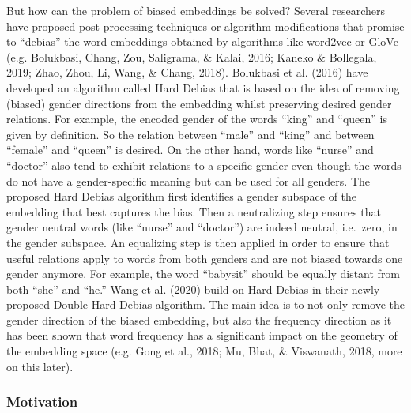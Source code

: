 \documentclass[
  english,
  man,floatsintext]{apa6}
\begin{document}
But how can the problem of biased embeddings be solved? Several researchers have proposed post-processing techniques or algorithm modifications that promise to ``debias'' the word embeddings obtained by algorithms like word2vec or GloVe (e.g. Bolukbasi, Chang, Zou, Saligrama, \& Kalai, 2016; Kaneko \& Bollegala, 2019; Zhao, Zhou, Li, Wang, \& Chang, 2018).
Bolukbasi et al. (2016) have developed an algorithm called Hard Debias that is based on the idea of removing (biased) gender directions from the embedding whilst preserving desired gender relations. For example, the encoded gender of the words ``king'' and ``queen'' is given by definition. So the relation between ``male'' and ``king'' and between ``female'' and ``queen'' is desired. On the other hand, words like ``nurse'' and ``doctor'' also tend to exhibit relations to a specific gender even though the words do not have a gender-specific meaning but can be used for all genders. The proposed Hard Debias algorithm first identifies a gender subspace of the embedding that best captures the bias. Then a neutralizing step ensures that gender neutral words (like ``nurse'' and ``doctor'') are indeed neutral, i.e.~zero, in the gender subspace. An equalizing step is then applied in order to ensure that useful relations apply to words from both genders and are not biased towards one gender anymore. For example, the word ``babysit'' should be equally distant from both ``she'' and ``he.''
Wang et al. (2020) build on Hard Debias in their newly proposed Double Hard Debias algorithm. The main idea is to not only remove the gender direction of the biased embedding, but also the frequency direction as it has been shown that word frequency has a significant impact on the geometry of the embedding space (e.g. Gong et al., 2018; Mu, Bhat, \& Viswanath, 2018, more on this later).

\hypertarget{motivation}{%
\subsubsection{Motivation}\label{motivation}}
\end{document}
